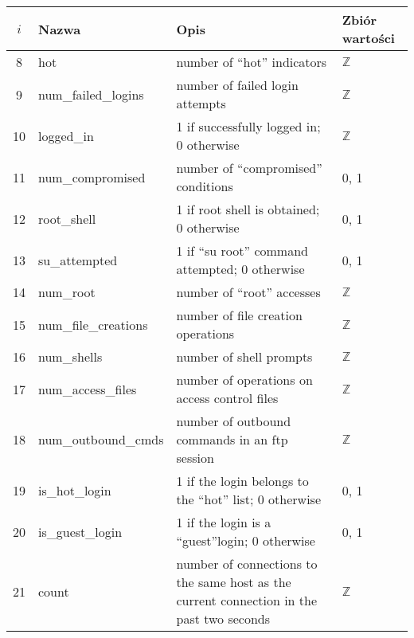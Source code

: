 \documentclass[a4paper, 12pt]{article}
\begin{document}
\begin{tabular}{ | c | l | p{} | p{} | } \hline
$i$ & Nazwa & Opis & Zbiór wartości \\ \hline
8      & hot & number of ``hot'' indicators  & $\mathbb{Z}$ \\ \hline
9      & num\_failed\_logins  & number of failed login attempts   & $\mathbb{Z}$ \\ \hline
10      & logged\_in  & 1 if successfully logged in; 0 otherwise   & $\mathbb{Z}$ \\ \hline
11      & num\_compromised & number of ``compromised'' conditions   &  0, 1 \\ \hline
12      & root\_shell  & 1 if root shell is obtained; 0 otherwise  &  0, 1 \\ \hline
13      & su\_attempted  & 1 if ``su root'' command attempted; 0 otherwise &  0, 1 \\ \hline
14      & num\_root  & number of ``root'' accesses   & $\mathbb{Z}$ \\ \hline
15      & num\_file\_creations  & number of file creation operations   & $\mathbb{Z}$ \\ \hline
16      & num\_shells  & number of shell prompts  & $\mathbb{Z}$ \\ \hline
17      & num\_access\_files  & number of operations on access control files  & $\mathbb{Z}$ \\ \hline
18      & num\_outbound\_cmds & number of outbound commands in an ftp session   & $\mathbb{Z}$ \\ \hline
19      & is\_hot\_login  & 1 if the login belongs to the ``hot'' list; 0 otherwise   &  0, 1 \\ \hline
20      & is\_guest\_login  & 1 if the login is a ``guest''login; 0 otherwise  &  0, 1 \\ \hline
21     & count & number of connections to the same host as the current connection in the past two seconds  & $\mathbb{Z}$ \\ \hline
\end{tabular}
\end{document}
